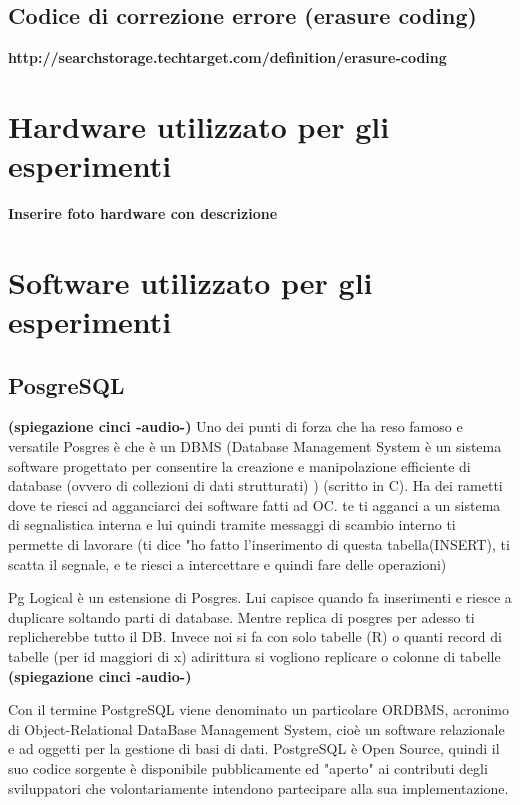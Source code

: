 \subsection{Codice di correzione errore (erasure coding)}
\textbf{http://searchstorage.techtarget.com/definition/erasure-coding}
\item
\section{Hardware utilizzato per gli esperimenti}
\textbf{Inserire foto hardware con descrizione}
\item
\section{Software utilizzato per gli esperimenti}
\item
\subsection{PosgreSQL}

\textbf{(spiegazione cinci -audio-)}
Uno dei punti di forza che ha reso famoso e versatile Posgres è che è un DBMS (Database Management System è un sistema software progettato per consentire la creazione e manipolazione efficiente di database (ovvero di collezioni di dati strutturati) ) (scritto in C). Ha dei rametti dove te riesci ad agganciarci dei software fatti ad OC. te ti agganci a un sistema di segnalistica interna e lui quindi tramite messaggi di scambio interno ti permette di lavorare (ti dice "ho fatto l'inserimento di questa tabella(INSERT), ti scatta il segnale, e te riesci a intercettare e quindi fare delle operazioni)

Pg Logical è un estensione di Posgres. Lui capisce quando fa inserimenti e riesce a duplicare soltando parti di database. Mentre replica di posgres per adesso ti replicherebbe tutto il DB. Invece noi si fa con solo tabelle (R) o quanti record di tabelle (per id maggiori di x) adirittura si vogliono replicare o colonne di tabelle \\
\textbf{(spiegazione cinci -audio-)}


Con il termine PostgreSQL viene denominato un particolare ORDBMS, acronimo di Object-Relational DataBase Management System, cioè un software relazionale e ad oggetti per la gestione di basi di dati.
PostgreSQL è Open Source, quindi il suo codice sorgente è disponibile pubblicamente ed "aperto" ai contributi degli sviluppatori che volontariamente intendono partecipare alla sua implementazione.

